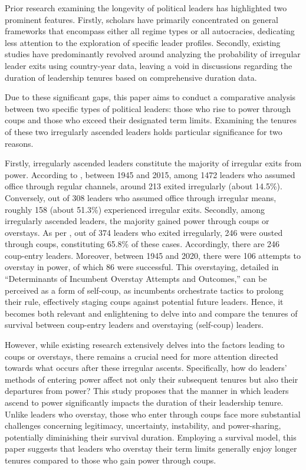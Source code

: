\documentclass[
  12pt,
  a4paper,
  12pt]{article}
\begin{document}
Prior research examining the longevity of political leaders has
highlighted two prominent features. Firstly, scholars have primarily
concentrated on general frameworks that encompass either all regime
types or all autocracies, dedicating less attention to the exploration
of specific leader profiles. Secondly, existing studies have
predominantly revolved around analyzing the probability of irregular
leader exits using country-year data, leaving a void in discussions
regarding the duration of leadership tenures based on comprehensive
duration data.

Due to these significant gaps, this paper aims to conduct a comparative
analysis between two specific types of political leaders: those who rise
to power through coups and those who exceed their designated term
limits. Examining the tenures of these two irregularly ascended leaders
holds particular significance for two reasons.

Firstly, irregularly ascended leaders constitute the majority of
irregular exits from power. According to \citep{goemans2009}, between
1945 and 2015, among 1472 leaders who assumed office through regular
channels, around 213 exited irregularly (about 14.5\%). Conversely, out
of 308 leaders who assumed office through irregular means, roughly 158
(about 51.3\%) experienced irregular exits. Secondly, among irregularly
ascended leaders, the majority gained power through coups or overstays.
As per \citep{goemans2009}, out of 374 leaders who exited irregularly,
246 were ousted through coups, constituting 65.8\% of these cases.
Accordingly, there are 246 coup-entry leaders. Moreover, between 1945
and 2020, there were 106 attempts to overstay in power, of which 86 were
successful. This overstaying, detailed in ``Determinants of Incumbent
Overstay Attempts and Outcomes,'' can be perceived as a form of
self-coup, as incumbents orchestrate tactics to prolong their rule,
effectively staging coups against potential future leaders. Hence, it
becomes both relevant and enlightening to delve into and compare the
tenures of survival between coup-entry leaders and overstaying
(self-coup) leaders.

However, while existing research extensively delves into the factors
leading to coups or overstays, there remains a crucial need for more
attention directed towards what occurs after these irregular ascents.
Specifically, how do leaders' methods of entering power affect not only
their subsequent tenures but also their departures from power? This
study proposes that the manner in which leaders ascend to power
significantly impacts the duration of their leadership tenure. Unlike
leaders who overstay, those who enter through coups face more
substantial challenges concerning legitimacy, uncertainty, instability,
and power-sharing, potentially diminishing their survival duration.
Employing a survival model, this paper suggests that leaders who
overstay their term limits generally enjoy longer tenures compared to
those who gain power through coups.
\end{document}

